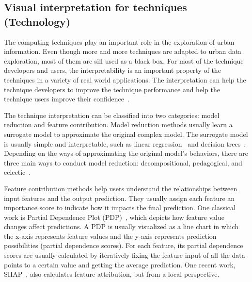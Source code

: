 \subsection{Visual interpretation for techniques (Technology)}
The computing techniques play an important role in the exploration of urban information. Even though more and more techniques are adapted to urban data exploration, most of them are sill used as a black box. For most of the technique developers and users, the interpretability is an important property of the techniques in a variety of real world applications. The interpretation can help the technique developers to improve the technique performance and help the technique users improve their confidence~\cite{strobelt2018lstmvis}. 

The technique interpretation can be classified into two categories: model reduction and feature contribution.
Model reduction methods usually learn a surrogate model to approximate the original complex model.
The surrogate model is usually simple and interpretable, such as linear regression~\cite{ribeiro2016should} and decision trees~\cite{craven1996extracting}. 
Depending on the ways of approximating the original model's behaviors, there are three main ways to conduct model reduction: decompositional, pedagogical, and eclectic~\cite{andrews1995survey}.

Feature contribution methods help users understand the relationships between input features and the output prediction.
They usually assign each feature an importance score to indicate how it impacts the final prediction.
One classical work is Partial Dependence Plot (PDP)~\cite{friedman2001greedy}, which depicts how feature value changes affect predictions.
A PDP is usually visualized as a line \textbf{}chart in which the x-axis represents feature values and the y-axis represents prediction possibilities (partial dependence scores).
For each feature, its partial dependence scores are usually calculated by iteratively fixing the feature input of all the data points to a certain value and getting the average prediction.
One recent work, SHAP~\cite{lundberg2017unified}, also calculates feature attribution, but from a local perspective.


